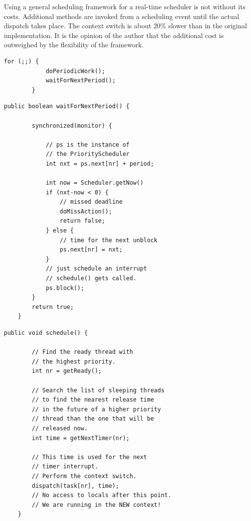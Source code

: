 Using a general scheduling framework for a real-time scheduler is
not without its costs. Additional methods are invoked from a
scheduling event until the actual dispatch takes place. The context
switch is about 20\% slower than in the original implementation. It
is the opinion of the author that the additional cost is outweighed
by the flexibility of the framework.

\begin{lstlisting}[float,caption={Code fragment oft the application},
label=lst:arch:rt:user:app]
        for (;;) {
            doPeriodicWork();
            waitForNextPeriod();
        }
\end{lstlisting}

\begin{lstlisting}[float,caption={Implementation in RtThread},
label=lst:arch:rt:user:rtthr]
    public boolean waitForNextPeriod() {

        synchronized(monitor) {

            // ps is the instance of
            // the PriorityScheduler
            int nxt = ps.next[nr] + period;

            int now = Scheduler.getNow()
            if (nxt-now < 0) {
                // missed deadline
                doMissAction();
                return false;
            } else {
                // time for the next unblock
                ps.next[nr] = nxt;
            }
            // just schedule an interrupt
            // schedule() gets called.
            ps.block();
        }
        return true;
    }
\end{lstlisting}

\begin{lstlisting}[float,caption={Implementation of the PriorityScheduler},
label=lst:arch:rt:user:prsched]
    public void schedule() {

        // Find the ready thread with
        // the highest priority.
        int nr = getReady();

        // Search the list of sleeping threads
        // to find the nearest release time
        // in the future of a higher priority
        // thread than the one that will be
        // released now.
        int time = getNextTimer(nr);

        // This time is used for the next
        // timer interrupt.
        // Perform the context switch.
        dispatch(task[nr], time);
        // No access to locals after this point.
        // We are running in the NEW context!
    }
\end{lstlisting}


